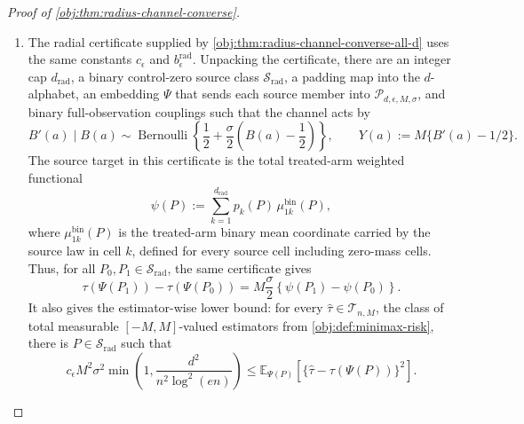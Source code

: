 \documentclass[11pt]{article}
\begin{document}
\begin{proof}[Proof of \cref{obj:thm:radius-channel-converse}]
\begin{enumerate}
\item The radial certificate supplied by \cref{obj:thm:radius-channel-converse-all-d} uses the same constants \(c_{\epsilon}\) and \(b_{\epsilon}^{\mathrm{rad}}\).  Unpacking the certificate, there are an integer cap \(d_{\mathrm{rad}}\), a binary control-zero source class \(\mathcal S_{\mathrm{rad}}\), a padding map into the \(d\)-alphabet, an embedding \(\Psi\) that sends each source member into \(\mathcal P_{d,\epsilon,M,\sigma}\), and binary full-observation couplings such that the channel acts by
\[
B'(a)\mid B(a)
\sim
\operatorname{Bernoulli}\!\left\{
\frac12+\frac{\sigma}{2}\left(B(a)-\frac12\right)
\right\},
\qquad
Y(a):=M\{B'(a)-1/2\}.
\]
The source target in this certificate is the total treated-arm weighted functional
\[
\psi(P)
:=
\sum_{k=1}^{d_{\mathrm{rad}}}
p_k(P)\,\mu_{1k}^{\mathrm{bin}}(P),
\]
where \(\mu_{1k}^{\mathrm{bin}}(P)\) is the treated-arm binary mean coordinate carried by the source law in cell \(k\), defined for every source cell including zero-mass cells.  Thus, for all \(P_0,P_1\in\mathcal S_{\mathrm{rad}}\), the same certificate gives
\[
\tau(\Psi(P_1))-\tau(\Psi(P_0))
=
M\frac{\sigma}{2}
\left\{
\psi(P_1)-\psi(P_0)
\right\}.
\]
It also gives the estimator-wise lower bound: for every
\(\widehat\tau\in\mathcal T_{n,M}\), the class of total measurable \([-M,M]\)-valued estimators from \cref{obj:def:minimax-risk}, there is \(P\in\mathcal S_{\mathrm{rad}}\) such that
\[
c_{\epsilon}M^2\sigma^2
\min\left(1,\frac{d^2}{n^2\log^2(en)}\right)
\le
\mathbb E_{\Psi(P)}
\left[
\{\widehat\tau-\tau(\Psi(P))\}^2
\right].
\] %
\end{enumerate}
\end{proof}
\end{document}
